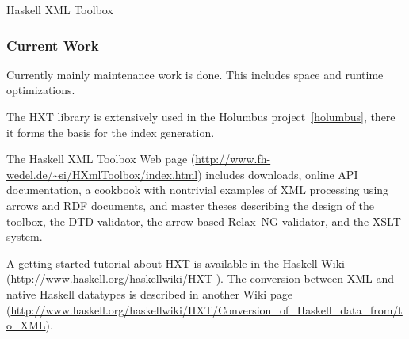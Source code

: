 \begin{hcarentry}[updated]{Haskell XML Toolbox}
\subsubsection*{Current Work}

Currently mainly maintenance work is done. This includes
space and runtime optimizations.

The HXT library is extensively used in the Holumbus
project~\cref{holumbus}, there it forms the basis for the index generation.

\FurtherReading
The Haskell XML Toolbox Web page
(\url{http://www.fh-wedel.de/~si/HXmlToolbox/index.html})
includes downloads, online API documentation, a cookbook with nontrivial examples
of XML processing using arrows and RDF documents, and master theses describing the
design of the toolbox, the DTD validator, the arrow based Relax~NG
validator, and the XSLT system.

A getting started tutorial about HXT is available in the Haskell Wiki (\url{http://www.haskell.org/haskellwiki/HXT}
). The conversion between XML and native Haskell datatypes is
described in another Wiki page
(\url{http://www.haskell.org/haskellwiki/HXT/Conversion_of_Haskell_data_from/to_XML}).
\end{hcarentry}
